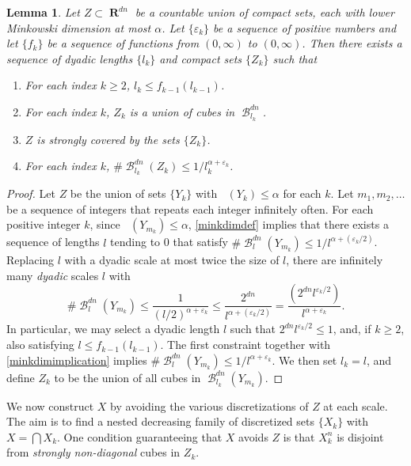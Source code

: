 \documentclass[dvipsnames,letterpaper,12pt]{article}
\numberwithin{equation}{section}
\theoremstyle{plain}
\newtheorem{lemma}{Lemma}
\DeclareMathOperator{\lowminkdim}{\underline{\dim}_{\mathbf{M}}}
\DeclareMathOperator{\RR}{\mathbf{R}}
\DeclareMathOperator{\B}{\mathcal{B}}
\begin{document}
\begin{lemma} \label{coveringlemma}
	Let $Z \subset \RR^{dn}$ be a countable union of compact sets, each with lower Minkowski dimension at most $\alpha$. Let $\{ \varepsilon_k \}$ be a sequence of positive numbers and let $\{ f_k \}$ be a sequence of functions from $(0,\infty)$ to $(0,\infty)$. Then there exists a sequence of dyadic lengths $\{ l_k \}$ and compact sets $\{ Z_k \}$ such that
	\begin{enumerate}
		\item For each index $k \geq 2$, $l_k \leq f_{k-1}(l_{k-1})$.
		\item For each index $k$, $Z_k$ is a union of cubes in $\B^{dn}_{l_k}$.
		\item $Z$ is strongly covered by the sets $\{ Z_k \}$.
		\item For each index $k$, $\# \B^{dn}_{l_k}(Z_k) \leq 1/l_k^{\alpha + \varepsilon_k}$.
	\end{enumerate}
\end{lemma}
\begin{proof}
	Let $Z$ be the union of sets $\{ Y_k \}$ with $\lowminkdim(Y_k) \leq \alpha$ for each $k$. Let $m_1, m_2, \dots$ be a sequence of integers that repeats each integer infinitely often. For each positive integer $k$, since $\lowminkdim(Y_{m_k}) \leq \alpha$, \eqref{minkdimdef} implies that there exists a sequence of lengths $l$ tending to 0 that satisfy $\# \B_l^{dn}(Y_{m_k}) \leq 1/l^{\alpha + (\varepsilon_k/2)}$. Replacing $l$ with a dyadic scale at most twice the size of $l$, there are infinitely many {\it dyadic} scales $l$ with
	\begin{equation} \label{minkdimimplication}
		\# \B^{dn}_l(Y_{m_k}) \leq \frac{1}{(l/2)^{\alpha + \varepsilon_k}} \leq \frac{2^{dn}}{l^{\alpha + (\varepsilon_k/2)}} = \frac{\left( 2^{dn} l^{\varepsilon_k/2} \right)}{l^{\alpha + \varepsilon_k}}.
	\end{equation}
	In particular, we may select a dyadic length $l$ such that $2^{dn} l^{\varepsilon_k/2} \leq 1$, and, if $k \geq 2$, also satisfying $l \leq f_{k-1}(l_{k-1})$. The first constraint together with \eqref{minkdimimplication} implies $\# \B^{dn}_l(Y_{m_k}) \leq 1/l^{\alpha + \varepsilon_k}$. We then set $l_k = l$, and define $Z_k$ to be the union of all cubes in $\B_{l_k}^{dn}(Y_{m_k})$.
\end{proof}

We now construct $X$ by avoiding the various discretizations of $Z$ at each scale. The aim is to find a nested decreasing family of discretized sets $\{ X_k \}$ with $X = \bigcap X_k$. One condition guaranteeing that $X$ avoids $Z$ is that $X_k^n$ is disjoint from {\it strongly non-diagonal} cubes in $Z_k$.
\end{document}

